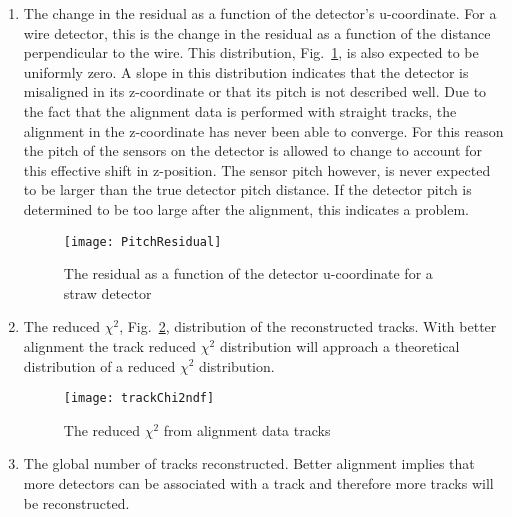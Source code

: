 \begin{enumerate}[label=\roman*)]
\item The change in the residual as a function of the detector's u-coordinate.
  For a wire detector, this is the change in the residual as a function of the
  distance perpendicular to the wire.  This distribution,
  Fig.~\ref{fig::PitchResidual}, is also expected to be uniformly zero.  A slope
  in this distribution indicates that the detector is misaligned in its
  z-coordinate or that its pitch is not described well.  Due to the fact that
  the alignment data is performed with straight tracks, the alignment in the
  z-coordinate has never been able to converge.  For this reason the pitch of
  the sensors on the detector is allowed to change to account for this effective
  shift in z-position.  The sensor pitch however, is never expected to be larger
  than the true detector pitch distance.  If the detector pitch is determined to
  be too large after the alignment, this indicates a problem.
  \begin{figure}[h!t]
    \centering \texttt{[image: PitchResidual]}
    \caption{The residual as a function of the detector u-coordinate for a straw
      detector}
    \label{fig::PitchResidual}
  \end{figure}

\item The reduced $\chi^2$, Fig.~\ref{fig::trackChi2ndf}, distribution of the
  reconstructed tracks.  With better alignment the track reduced $\chi^2$
  distribution will approach a theoretical distribution of a reduced $\chi^2$
  distribution.
  \begin{figure}[h!t]
    \centering \texttt{[image: trackChi2ndf]}
    \caption{The reduced $\chi^2$ from alignment data tracks}
    \label{fig::trackChi2ndf}
  \end{figure}
  
\item The global number of tracks reconstructed.  Better alignment
  implies that more detectors can be associated with a track and therefore more
  tracks will be reconstructed.
\end{enumerate}
